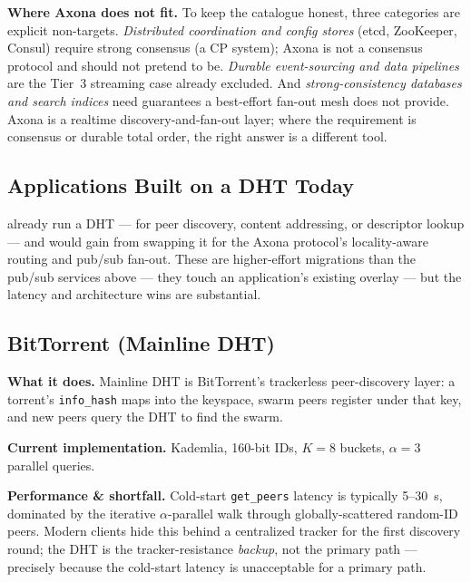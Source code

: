 \documentclass[nobib]{tufte-handout}
\begin{document}
\textbf{Where Axona does not fit.} To keep the catalogue honest, three
categories are explicit non-targets. \emph{Distributed coordination and
config stores} (etcd, ZooKeeper, Consul) require strong consensus (a CP
system); Axona is not a consensus protocol and should not pretend to be.
\emph{Durable event-sourcing and data pipelines} are the Tier~3
streaming case already excluded. And \emph{strong-consistency databases
and search indices} need guarantees a best-effort fan-out mesh does not
provide. Axona is a realtime discovery-and-fan-out layer; where the
requirement is consensus or durable total order, the right answer is a
different tool.

\subsection{Applications Built on a DHT Today}

 already run a DHT --- for peer
discovery, content addressing, or descriptor lookup --- and would gain
from swapping it for the Axona protocol's locality-aware routing and
pub/sub fan-out. These are higher-effort migrations than the pub/sub
services above --- they touch an application's existing overlay --- but
the latency and architecture wins are substantial.

\subsection{BitTorrent (Mainline DHT)}

\textbf{What it does.} Mainline DHT is BitTorrent's trackerless
peer-discovery layer: a torrent's \texttt{info\_hash} maps into the
keyspace, swarm peers register under that key, and new peers query the
DHT to find the swarm.

\textbf{Current implementation.} Kademlia, 160-bit IDs, $K{=}8$
buckets, $\alpha{=}3$ parallel queries.

\textbf{Performance \& shortfall.} Cold-start \texttt{get\_peers}
latency is typically 5--30~s, dominated by the iterative
$\alpha$-parallel walk through globally-scattered random-ID peers.
Modern clients hide this behind a centralized tracker for the first
discovery round; the DHT is the tracker-resistance \emph{backup}, not
the primary path --- precisely because the cold-start latency is
unacceptable for a primary path.
\end{document}
